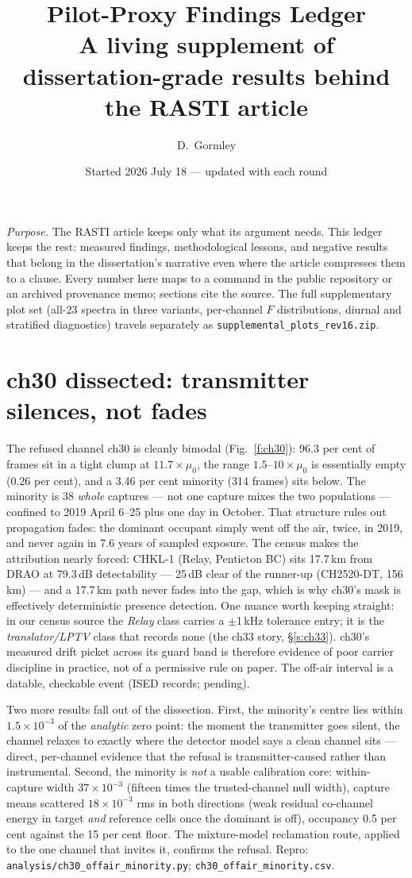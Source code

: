 \documentclass[10pt]{article}
\title{Pilot-Proxy Findings Ledger\\
\large A living supplement of dissertation-grade results behind the RASTI article}
\author{D.~Gormley}
\date{Started 2026 July 18 --- updated with each round}
\begin{document}
\maketitle

\noindent\emph{Purpose.} The RASTI article keeps only what its argument
needs. This ledger keeps the rest: measured findings, methodological
lessons, and negative results that belong in the dissertation's
narrative even where the article compresses them to a clause. Every
number here maps to a command in the public repository or an archived
provenance memo; sections cite the source. The full supplementary plot
set (all-23 spectra in three variants, per-channel $F$ distributions,
diurnal and stratified diagnostics) travels separately as
\texttt{supplemental\_plots\_rev16.zip}.

\section{ch30 dissected: transmitter silences, not fades}
\label{s:ch30}
The refused channel ch30 is cleanly bimodal (Fig.~\ref{f:ch30}): 96.3
per cent of frames sit in a tight clump at $11.7\times\mu_0$, the range
$1.5$--$10\times\mu_0$ is essentially empty (0.26 per cent), and a 3.46
per cent minority (314 frames) sits below. The minority is 38
\emph{whole} captures --- not one capture mixes the two populations ---
confined to 2019 April 6--25 plus one day in October. That structure
rules out propagation fades: the dominant occupant simply went off the
air, twice, in 2019, and never again in 7.6 years of sampled exposure.
The census makes the attribution nearly forced: CHKL-1 (Relay,
Penticton BC) sits 17.7\,km from DRAO at 79.3\,dB detectability ---
25\,dB clear of the runner-up (CH2520-DT, 156\,km) --- and a 17.7\,km
path never fades into the gap, which is why ch30's mask is effectively
deterministic presence detection. One nuance worth keeping straight:
in our census source the \emph{Relay} class carries a $\pm$1\,kHz
tolerance entry; it is the \emph{translator/LPTV} class that records
none (the ch33 story, \S\ref{s:ch33}). ch30's measured drift picket
across its guard band is therefore evidence of poor carrier discipline
in practice, not of a permissive rule on paper. The off-air interval
is a datable, checkable event (ISED records; pending).

Two more results fall out of the dissection. First, the minority's
centre lies within $1.5\times10^{-3}$ of the \emph{analytic} zero
point: the moment the transmitter goes silent, the channel relaxes to
exactly where the detector model says a clean channel sits --- direct,
per-channel evidence that the refusal is transmitter-caused rather
than instrumental. Second, the minority is \emph{not} a usable
calibration core: within-capture width $37\times10^{-3}$ (fifteen
times the trusted-channel null width), capture means scattered
$18\times10^{-3}$ rms in both directions (weak residual co-channel
energy in target \emph{and} reference cells once the dominant is off),
occupancy 0.5 per cent against the 15 per cent floor. The
mixture-model reclamation route, applied to the one channel that
invites it, confirms the refusal. Repro:
\texttt{analysis/ch30\_offair\_minority.py};
\texttt{ch30\_offair\_minority.csv}.
\end{document}
